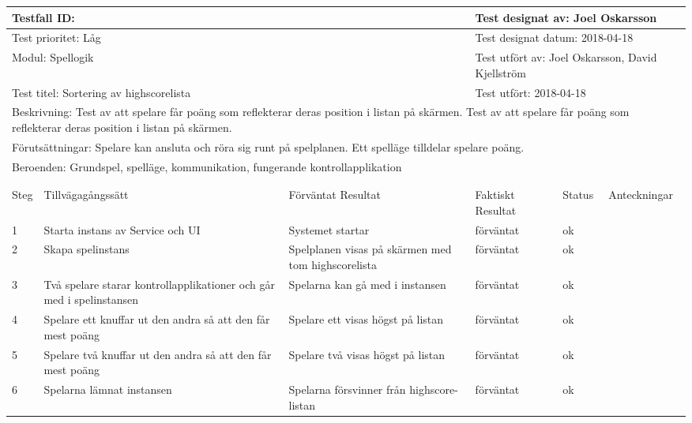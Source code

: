 \documentclass[10pt]{article}
\begin{document}
\begin{tabular}{| p{1cm}|  p{3cm} | p{3cm}| p{3cm}| p{2cm}| p{3cm}|}
	\hline
	\multicolumn{3}{|l|}{Testfall ID:}&\multicolumn{3}{|l|}{Test designat av: Joel Oskarsson}\\
	\hline
	\multicolumn{3}{|l|}{Test prioritet: Låg}&\multicolumn{3}{|l|}{Test designat datum: 2018-04-18}\\
	\hline
	\multicolumn{3}{|l|}{Modul: Spellogik}&\multicolumn{3}{|l|}{Test utfört av: Joel Oskarsson, David Kjellström}\\
	\hline
	\multicolumn{3}{|l|}{Test titel: Sortering av highscorelista}&\multicolumn{3}{|l|}{Test utfört: 2018-04-18}\\
	\hline
	\multicolumn{6}{|p{\textwidth}|}{Beskrivning: Test av att spelare får poäng som reflekterar deras position i listan på skärmen. Test av att spelare får poäng som reflekterar deras position i listan på skärmen.}\\
	\hline
	\multicolumn{6}{|l|}{Förutsättningar: Spelare kan ansluta och röra sig runt på spelplanen. Ett spelläge tilldelar spelare poäng.}\\
	\hline
	\multicolumn{6}{|l|}{Beroenden: Grundspel, spelläge, kommunikation, fungerande kontrollapplikation}\\

	\hline
	\multicolumn{6}{|l|}{}\\
	\multicolumn{6}{|l|}{}\\
      	\hline
	Steg&Tillvägagångssätt&Förväntat Resultat&Faktiskt Resultat&Status&Anteckningar \\
	\hline
	1& Starta instans av Service och UI & Systemet startar & förväntat & ok &\\
      	\hline
	2& Skapa spelinstans & Spelplanen visas på skärmen med tom highscorelista & förväntat & ok &\\
      	\hline
	3& Två spelare starar kontrollapplikationer och går med i spelinstansen & Spelarna kan gå med i instansen & förväntat & ok &\\
      	\hline
  4& Spelare ett knuffar ut den andra så att den får mest poäng & Spelare ett visas högst på listan & förväntat & ok & \\ \hline
  5& Spelare två knuffar ut den andra så att den får mest poäng & Spelare två visas högst på listan & förväntat & ok & \\ \hline
  6& Spelarna lämnat instansen & Spelarna försvinner från highscore-listan & förväntat & ok & \\ \hline
\end{tabular}
\end{document}
